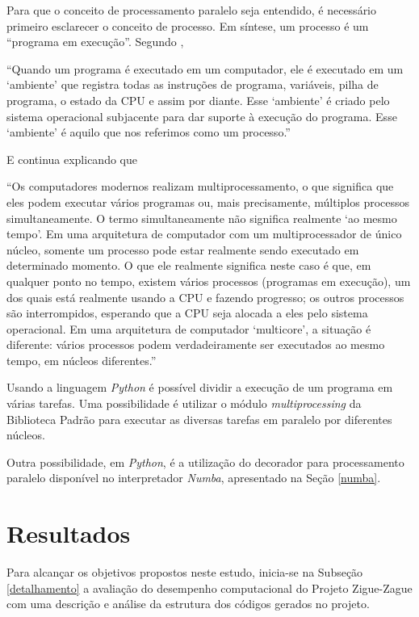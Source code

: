\documentclass[12pt]{article}
\newcommand{\aspas}[1]{``#1''} %
\newcommand{\citacao}[1]{
	\singlespacing %
	\begin{flushright}
		\begin{minipage}{0.75\linewidth} %
			{\fontsize{10}{\baselineskip}\selectfont \aspas{#1}}
		\end{minipage}
	\end{flushright}
	\onehalfspacing %
}
\begin{document}
Para que o conceito de processamento paralelo seja entendido, é necessário primeiro esclarecer o conceito de processo. Em síntese, um processo é um \aspas{programa em execução}. Segundo \cite{perkovic:2016},

\citacao{Quando um programa é executado em um computador, ele é executado em um `ambiente' que registra todas as instruções de programa, variáveis, pilha de programa, o estado da CPU e assim por diante. Esse `ambiente' é criado pelo sistema operacional subjacente para dar suporte à execução do programa. Esse `ambiente' é aquilo que nos referimos como um processo.}

\noindent E continua explicando que 

\citacao{Os computadores modernos realizam multiprocessamento, o que significa que eles podem executar vários
	programas ou, mais precisamente, múltiplos processos simultaneamente. O termo simultaneamente não significa realmente `ao mesmo tempo'. Em uma arquitetura de computador com um multiprocessador de único núcleo, somente
	um processo pode estar realmente sendo executado em determinado momento. O que ele realmente significa neste
	caso é que, em qualquer ponto no tempo, existem vários processos (programas em execução), um dos quais está
	realmente usando a CPU e fazendo progresso; os outros processos são interrompidos, esperando que a CPU seja
	alocada a eles pelo sistema operacional. Em uma arquitetura de computador `multicore', a situação é diferente: vários
	processos podem verdadeiramente ser executados ao mesmo tempo, em núcleos diferentes.}

Usando a linguagem \textit{Python} é possível dividir a execução de um programa em várias tarefas. Uma possibilidade é utilizar o módulo \textit{multiprocessing} da Biblioteca Padrão para executar as diversas tarefas em paralelo por diferentes núcleos.

Outra possibilidade, em \textit{Python}, é a utilização do decorador para processamento paralelo disponível no interpretador \textit{Numba}, apresentado na Seção \ref{numba}.

\section{Resultados}

Para alcançar os objetivos propostos neste estudo, inicia-se na Subseção \ref{detalhamento} a avaliação do desempenho computacional do Projeto Zigue-Zague com uma descrição e análise da estrutura dos códigos gerados no projeto.
\end{document}
